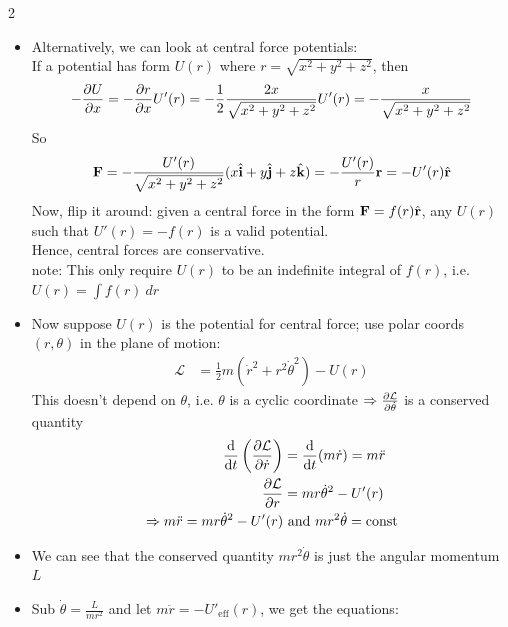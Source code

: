 \documentclass[10pt, portrait]{article}
\newcommand{\uvec}[1]{\hat{\mathbf{#1}}}
\begin{document}
\begin{multicols*}{2}
\begin{itemize}
\begin{center}
\[        \]
    \end{center}
    only depends on $r_i$ and $r_f \Rightarrow$ only depends on $P$ and $Q$
    \item Alternatively, we can look at central force potentials: \\
    If a potential has form $U(r)$ where $r = \sqrt{x^2 + y^2 + z^2}$, then
    \[
    \begin{aligned}
        -\pdv{U}{x} = -\pdv{r}{x}U'(r) = -\frac{1}{2}\frac{2x}{\sqrt{x^2 + y^2 + z^2}}U'(r) = -\frac{x}{\sqrt{x^2 + y^2 + z^2}}
    \end{aligned}
    \]
    So
    \[
    \begin{aligned}
        \vb{F} = -\frac{U'(r)}{\sqrt{x^2 + y^2 + z^2}}(x\uvec{i} + y\uvec{j} + z\uvec{k}) = -\frac{U'(r)}{r}\vb{r} = -U'(r)\uvec{r}
    \end{aligned}
    \]
    Now, flip it around: given a central force in the form $\vb{F} = f(r)\uvec{r}$, any $U(r)$ such that $U'(r) = -f(r)$ is a valid potential. \\
    Hence, central forces are conservative. \\
    note: This only require $U(r)$ to be an indefinite integral of $f(r)$, i.e. $U(r) = \int f(r) \ dr$
    \item Now suppose $U(r)$ is the potential for central force; use polar coords $(r, \theta)$ in the plane of motion:
    \[
    \begin{aligned}
        \mathcal{L} &= \frac{1}{2}m(\dot{r}^2 + r^2\dot{\theta}^2) - U(r)
    \end{aligned}
    \]
    This doesn't depend on $\theta$, i.e. $\theta$ is a cyclic coordinate $\Rightarrow \pdv{\mathcal{L}}{\dot{\theta}}$ is a conserved quantity
    \[
    \begin{aligned}
        \dv{t}\left(\pdv{\mathcal{L}}{\dot{r}}\right) &= \dv{t}(m\dot{r}) = m\ddot{r} \\
        \pdv{\mathcal{L}}{r} &= mr\dot{\theta}^2 - U'(r) \\
        \Rightarrow m\ddot{r} = mr\dot{\theta}^2 - U'(r) &\text{ and } mr^2\dot{\theta} = \text{const}
    \end{aligned}
    \]
    \item We can see that the conserved quantity $mr^2\dot{\theta}$ is just the angular momentum $L$
    \item Sub $\dot{\theta} = \frac{L}{mr^2}$ and let $m\ddot{r} = -U'_{\text{eff}}(r)$, we get the equations:
    \[
    \begin{aligned}

\end{aligned}\]
\end{itemize}
\end{multicols*}
\end{document}
